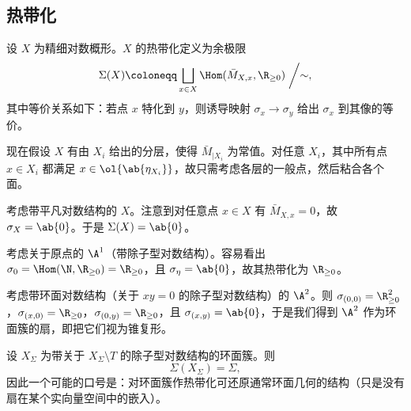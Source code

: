 \subsection{热带化}%
\label{sub:Tropicalization}

设 \(X\) 为精细对数概形。\(X\) 的热带化定义为余极限
\[\Sigma(X) \coloneqq \bigsqcup_{x \in X} \Hom(\bar{M}_{X,x}, \R_{\geq 0}) \biggm/ \sim, \]
其中等价关系如下：若点 \(x\) 特化到 \(y\)，则诱导映射 \(\sigma_x \to \sigma_y\) 给出 \(\sigma_x\) 到其像的等价。 

现在假设 \(X\) 有由 \(X_i\) 给出的分层，使得 \(\bar{M}_{|X_i}\) 为常值。对任意 \(X_i\)，其中所有点 \(x \in X_i\) 都满足 \(x \in \ol{\ab\{\eta_{X_i}\}}\)，故只需考虑各层的一般点，然后粘合各个面。 

\begin{exm}
    考虑带平凡对数结构的 \(X\)。注意到对任意点 \(x \in X\) 有 \(\bar{M}_{X,x} = 0\)，故 \(\sigma_X = \ab\{0\}\)。于是 \(\Sigma(X) = \ab\{0\}\)。
\end{exm}

\begin{exm}
    考虑关于原点的 \(\A^1\)（带除子型对数结构）。容易看出 \(\sigma_0 = \Hom(\N, \R_{\geq 0}) = \R_{\geq 0}\)，且 \(\sigma_{\eta} = \ab\{0\}\)，故其热带化为 \(\R_{\geq 0}\)。
\end{exm}

\begin{exm}
    考虑带环面对数结构（关于 \(xy = 0\) 的除子型对数结构）的 \(\A^2\)。则 \(\sigma_{(0,0)} = \R^2_{\geq 0}\)，\(\sigma_{(x,0)} = \R_{\geq 0}\)，\(\sigma_{(0,y)} = \R_{\geq 0}\)，且 \(\sigma_{(x,y)} = \ab\{0\}\)，于是我们得到 \(\A^2\) 作为环面簇的扇，即把它们视为锥复形。
\end{exm}

\begin{exm}
    设 \(X_{\Sigma}\) 为带关于 \(X_{\Sigma} \setminus T\) 的除子型对数结构的环面簇。则
    \[ \Sigma(X_{\Sigma}) = \Sigma, \]
    因此一个可能的口号是：对环面簇作热带化可还原通常环面几何的结构（只是没有扇在某个实向量空间中的嵌入）。
\end{exm}


